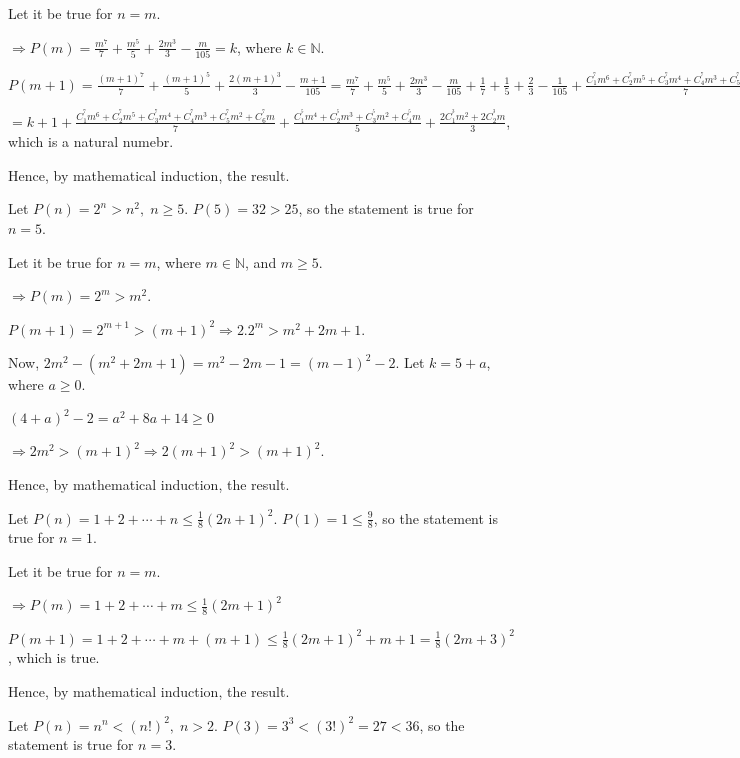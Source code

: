   Let it be true for $n = m$.

  $\Rightarrow P(m) = \frac{m^7}{7} + \frac{m^5}{5} + \frac{2m^3}{3} - \frac{m}{105} = k$, where
  $k\in\mathbb{N}$.

  $P(m + 1) = \frac{(m + 1)^7}{7} + \frac{(m + 1)^5}{5} + \frac{2(m + 1)^3}{3} - \frac{m + 1}{105} =
  \frac{m^7}{7} + \frac{m^5}{5} + \frac{2m^3}{3} - \frac{m}{105} + \frac{1}{7} + \frac{1}{5} + \frac{2}{3} -
  \frac{1}{105} + \frac{C_1^^7m^6 + C_2^^7m^5 + C_3^^7m^4 + C_4^^7m^3 + C_5^^7m^2 + C_6^^7m}{7} + \frac{C_1^^5m^4 +
  C_2^^5m^3 + C_3^^5m^2 + C_4^^5m}{5} + \frac{2C_1^^3m^2 + 2C_2^^3m}{3}$

  $= k + 1  + \frac{C_1^^7m^6 + C_2^^7m^5 + C_3^^7m^4 + C_4^^7m^3 + C_5^^7m^2 + C_6^^7m}{7} + \frac{C_1^^5m^4 +
    C_2^^5m^3 + C_3^^5m^2 + C_4^^5m}{5} + \frac{2C_1^^3m^2 + 2C_2^^3m}{3}$, which is a natural numebr.

  Hence, by mathematical induction, the result.
\item Let $P(n) = 2^n > n^2,\;n\geq 5$. $P(5) = 32 > 25$, so the statement is true for $n = 5$.

  Let it be true for $n = m$, where $m\in\mathbb{N}$, and $m \geq 5$.

  $\Rightarrow P(m) = 2^m > m^2$.

  $P(m + 1) = 2^{m + 1} > (m + 1)^2 \Rightarrow 2.2^m > m^2 + 2m + 1$.

  Now, $2m^2 - (m^2 + 2m + 1) = m^2 - 2m - 1 = (m - 1)^2 - 2$. Let $k = 5 + a$, where $a \geq 0$.

  $(4 + a)^2 - 2 = a^2 + 8a + 14 \geq 0$

  $\Rightarrow 2m^2 > (m + 1)^2 \Rightarrow 2(m + 1)^2 > (m + 1)^2$.

  Hence, by mathematical induction, the result.
\item Let $P(n) = 1 + 2 + \cdots + n\leq \frac{1}{8}(2n + 1)^2$. $P(1) = 1 \leq \frac{9}{8}$,
  so the statement is true for $n = 1$.

  Let it be true for $n = m$.

  $\Rightarrow P(m) = 1 + 2 + \cdots + m\leq \frac{1}{8}(2m + 1)^2$

  $P(m + 1) = 1 + 2 + \cdots + m + (m +1)\leq \frac{1}{8}(2m + 1)^2 + m + 1 = \frac{1}{8}(2m + 3)^2$, which
  is true.

  Hence, by mathematical induction, the result.
\item Let $P(n) = n^n < (n!)^2,\;n>2$. $P(3) = 3^3 < (3!)^2 = 27 < 36$, so the statement is true for $n =
  3$.

